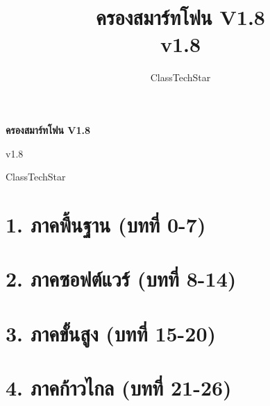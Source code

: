 \documentclass[11pt,a4paper,openany]{book}
\title{ครองสมาร์ทโฟน V1.8\\ \large v1.8}
\author{ClassTechStar}
\date{}
\begin{document}
\begin{titlepage}
\centering
\vspace*{0.28\textheight}
{\Huge\bfseries ครองสมาร์ทโฟน V1.8\par}
\vspace{1.2em}
{\Large v1.8\par}
\vfill
{\large ClassTechStar\par}
\end{titlepage}
\frontmatter
\tableofcontents
\mainmatter
\part*{1. ภาคพื้นฐาน (บทที่ 0-7)}










\part*{2. ภาคซอฟต์แวร์ (บทที่ 8-14)}








\part*{3. ภาคขั้นสูง (บทที่ 15-20)}







\part*{4. ภาคก้าวไกล (บทที่ 21-26)}







\end{document}
